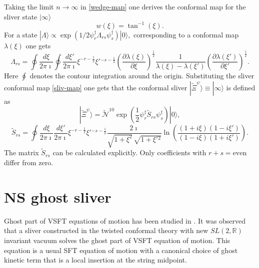 \documentclass[a4paper,12pt]{article}
\begin{document}
 Taking the limit
$n\rightarrow\infty$ in \eqref{wedge-map} one derives the
conformal map for the sliver state $|\infty\rangle$
\begin{equation}
w(\xi)=\tan^{-1}(\xi).\label{sliv-map}
\end{equation}
For a state
$|\Lambda\rangle\propto\exp(1/2\psi^{\dag}_{r}\Lambda_{rs}\psi^{\dag}_{s})|0\rangle,
$
corresponding to a
conformal map $\lambda(\xi)$ one gets
\begin{equation}
\Lambda_{rs}=\oint\frac{d\xi}{2\pi\imath}\oint\frac{d\xi'}{2\pi\imath}\xi^{-r-
\frac{1}{2}}\xi'{}^{-s-\frac{1}{2}}
\left(\frac{\partial
\lambda(\xi)}{\partial\xi}\right)^{\frac{1}{2}}\frac{1}{\lambda(\xi)-\lambda(\xi')}\left(\frac{\partial
\lambda(\xi')}{\partial\xi'}\right)^{\frac{1}{2}}.\label{state-map}
\end{equation}
Here $\oint$ denotes the contour integration around the origin.
Substituting the sliver conformal map \eqref{sliv-map} one gets that the conformal sliver
$|\tilde{\Xi}^{\psi}\rangle\equiv|\infty\rangle$ is defined as
\begin{equation}
|\tilde{\Xi}^{\psi}\rangle=\tilde{\mathcal{N}}^{10}\exp(\frac{1}{2}\psi^{\dag}_{r}\tilde{S}_{rs}\psi^{\dag}_{s})|0\rangle,
\end{equation}
\begin{equation}
\tilde{S}_{rs}=\oint\frac{d\xi}{2\pi\imath}\frac{d\xi'}{2\pi\imath}\xi^{-r-\frac{1}{2}}\xi'{}^{-s-\frac{1}{2}}
\frac{2\imath}{\sqrt{1+\xi^2}\,\sqrt{1+\xi'{}^2}}\ln\left(\frac{(1+i\xi)(1-i\xi')}{(1-i\xi)(1+i\xi')}\right).
\end{equation}
The matrix $\tilde{S}_{rs}$ can be calculated explicitly. Only
coefficients with $r+s=\text{even}$ differ from zero.


\section {NS ghost sliver}

Ghost part of VSFT equations of motion has been studied in
\cite{0108150,0111129}.
 It was observed that a sliver constructed in the twisted conformal theory
with new $SL(2,\mathbb{R})$ invariant vacuum
solves the ghost part of VSFT  equation of motion.
This equation is a usual SFT  equation of motion with a canonical choice
of ghost kinetic term
that is a local insertion at the  string midpoint.
\end{document}
